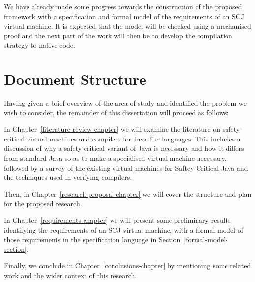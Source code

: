 \documentclass[a4paper,10pt]{report}
\begin{document}
We have already made some progress towards the construction of the proposed
framework with a specification and formal model of the requirements of an SCJ
virtual machine.  It is expected that the model will be checked using a
mechanised proof and the next part of the work will then be to develop the
compilation strategy to native code.

\section{Document Structure}

Having given a brief overview of the area of study and identified the problem we
wish to consider, the remainder of this dissertation will proceed as follows: 

In Chapter~\ref{literature-review-chapter} we will examine the literature on
safety-critical virtual machines and compilers for Java-like languages. This
includes a discussion of why a safety-critical variant of Java is necessary and
how it differs from standard Java so as to make a specialised virtual machine
necessary, followed by a survey of the existing virtual machines for
Saftey-Critical Java and the techniques used in verifying compilers.

Then, in Chapter~\ref{research-proposal-chapter} we will cover the structure and
plan for the proposed research.

In Chapter~\ref{requirements-chapter} we will present some
preliminary results identifying the requirements of an SCJ virtual machine, with
a formal model of those requirements in the \Circus{} specification language in
Section~\ref{formal-model-section}.

Finally, we conclude in Chapter~\ref{conclusions-chapter} by mentioning some
related work and the wider context of this research.

\end{document}
